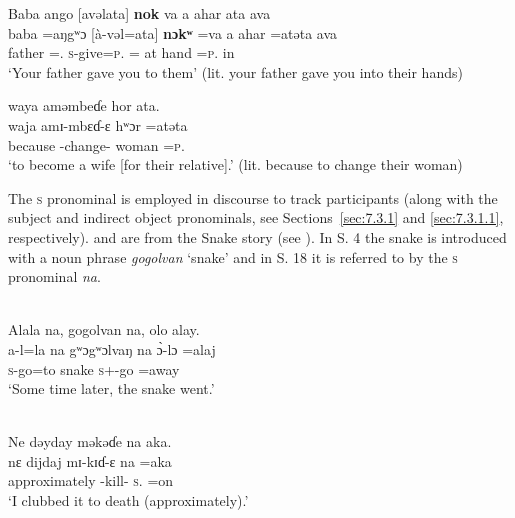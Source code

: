 \ea\label{ex:7:40}
Baba  ango  [avəlata]  \textbf{nok}  va  a  ahar  ata  ava\\
\gll baba  =aŋgʷɔ    [à-vəl=ata]  \textbf{nɔkʷ}  =va  a  ahar  =atəta    ava\\
father  ={\twoS}.{\POSS}  \textsc{s}-give=\textsc{p}.{\IO}  {\twoS}  ={\PRF}  at  hand  =\textsc{p}.{\POSS}  in\\
\glt ‘Your father gave you to them’ (lit. your father gave you into their hands) 

\medskip
waya  aməmbeɗe  hor  ata.\\
\gll waja  amɪ-mbɛɗ-ɛ  hʷɔr  =atəta\\
because  {\DEP}-change-{\CL}  woman  =\textsc{p}.{\POSS}\\
\glt ‘to become a wife [for their relative].’  (lit.  because to change their woman)
\z

The \textsc{s} pronominal is employed in discourse to track participants (along with the subject and indirect object pronominals, see Sections~\ref{sec:7.3.1} and \ref{sec:7.3.1.1}, respectively).  and  are from the Snake story (see ).  In S. 4  the snake is introduced with a noun phrase \textit{gogolvan} ‘snake’ and in S. 18  it is referred to by the \textsc{s} \DO pronominal \textit{na}. 

\ea\label{ex:7:41}\\
Alala  na,  gogolvan  na,  olo  alay.\\
\gll a-l=la na gʷɔgʷɔlvaŋ na \`{ɔ}-lɔ =alaj\\
\textsc{s}-go=to       {\PSP}  snake      {\PSP} \textsc{s}+{\PFV}-go   =away\\
\glt ‘Some time later, the snake went.’
\z

\ea\label{ex:7:42}\\
Ne dəyday  məkəɗe  na  aka.\\
\gll nɛ {dijdaj} mɪ-kɪɗ-ɛ na =aka \\
{\oneS}  approximately     {\NOM}{}-kill-{\CL}  \textsc{s}.{\DO}   =on\\
\glt ‘I clubbed it to death (approximately).’
\z

